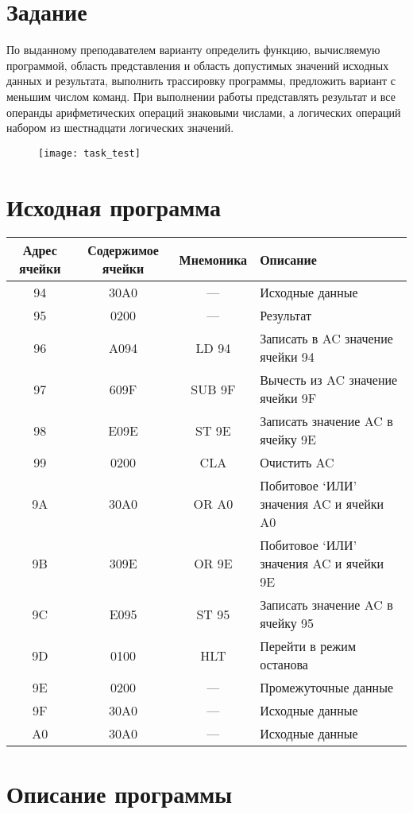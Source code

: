 \section{Задание}
По выданному преподавателем варианту определить функцию, вычисляемую программой, область представления и область допустимых значений исходных данных и результата, выполнить трассировку программы, предложить вариант с меньшим числом команд. При выполнении работы представлять результат и все операнды арифметических операций знаковыми числами, а логических операций набором из шестнадцати логических значений.
\begin{figure}[H]
\centering
\texttt{[image: task\_test]}
\label{pic:task}
\end{figure}

\section{Исходная программа}
\begin{center}
\begin{tabular}{|c|c|c|l|}
\hline
\textbf{Адрес ячейки} & \textbf{Содержимое ячейки} & \textbf{Мнемоника} & \textbf{Описание}\\
\hline
94 & 30A0 & --- & Исходные данные\\
95 & 0200 & --- & Результат\\
\hline
96 & A094 & LD 94 & Записать в AC значение ячейки 94\\
97 & 609F & SUB 9F & Вычесть из AC значение ячейки 9F\\
98 & E09E & ST 9E & Записать значение AC в ячейку 9E\\
99 & 0200 & CLA & Очистить AC\\
9A & 30A0 & OR A0 & Побитовое `ИЛИ' значения AC и ячейки A0\\
9B & 309E & OR 9E & Побитовое `ИЛИ' значения AC и ячейки 9E\\
9C & E095 & ST 95 & Записать значение AC в ячейку 95\\
9D & 0100 & HLT & Перейти в режим останова\\
\hline
9E & 0200 & --- & Промежуточные данные\\
9F & 30A0 & --- & Исходные данные\\
A0 & 30A0 & --- & Исходные данные\\
\hline
\end{tabular}
\end{center}

\section{Описание программы}
